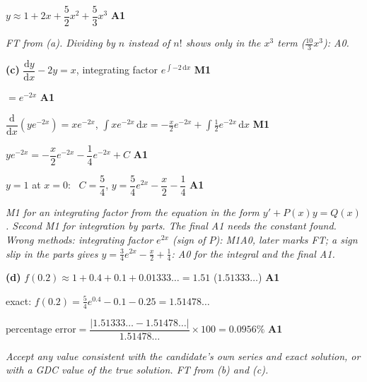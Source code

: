 \documentclass[12pt, twoside]{article}
\begin{document}
\begin{enumerate}[itemsep=0.3cm]
$y \approx 1 + 2x + \dfrac{5}{2}x^{2} + \dfrac{5}{3}x^{3}$ \hfill \textbf{A1}

\emph{FT from (a). Dividing by $n$ instead of $n!$ shows only in the
$x^{3}$ term ($\frac{10}{3}x^{3}$): A0.}

\textbf{(c)} $\dfrac{\mathrm{d}y}{\mathrm{d}x} - 2y = x$, \quad integrating factor $e^{\int -2\,\mathrm{d}x}$ \hfill \textbf{M1}

$= e^{-2x}$ \hfill \textbf{A1}

$\dfrac{\mathrm{d}}{\mathrm{d}x}\left(ye^{-2x}\right) = xe^{-2x}$, \quad $\displaystyle\int xe^{-2x}\,\mathrm{d}x = -\frac{x}{2}e^{-2x} + \int \frac{1}{2}e^{-2x}\,\mathrm{d}x$ \hfill \textbf{M1}

$ye^{-2x} = -\dfrac{x}{2}e^{-2x} - \dfrac{1}{4}e^{-2x} + C$ \hfill \textbf{A1}

$y = 1$ at $x = 0$: \ $C = \dfrac{5}{4}$, \quad $y = \dfrac{5}{4}e^{2x} - \dfrac{x}{2} - \dfrac{1}{4}$ \hfill \textbf{A1}

\emph{M1 for an integrating factor from the equation in the form
$y' + P(x)y = Q(x)$. Second M1 for integration by parts. The final A1 needs
the constant found. Wrong methods: integrating factor $e^{2x}$ (sign of
$P$): M1A0, later marks FT; a sign slip in the parts gives
$y = \frac{3}{4}e^{2x} - \frac{x}{2} + \frac{1}{4}$: A0 for the integral
and the final A1.}

\textbf{(d)} $f(0.2) \approx 1 + 0.4 + 0.1 + 0.01333\ldots = 1.51$ \quad ($1.51333\ldots$) \hfill \textbf{A1}

exact: $f(0.2) = \frac{5}{4}e^{0.4} - 0.1 - 0.25 = 1.51478\ldots$

$\text{percentage error} = \dfrac{|1.51333\ldots - 1.51478\ldots|}{1.51478\ldots} \times 100 = 0.0956\%$ \hfill \textbf{A1}

\emph{Accept any value consistent with the candidate's own series and
exact solution, or with a GDC value of the true solution. FT from (b) and
(c).}

\end{enumerate}
\end{document}
